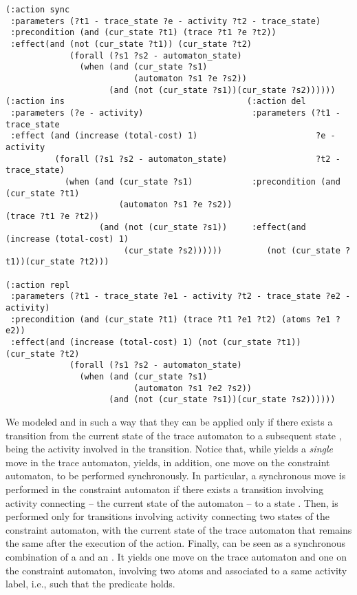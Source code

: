 \begin{scriptsize}
\begin{verbatim}
(:action sync
 :parameters (?t1 - trace_state ?e - activity ?t2 - trace_state)
 :precondition (and (cur_state ?t1) (trace ?t1 ?e ?t2))
 :effect(and (not (cur_state ?t1)) (cur_state ?t2)
             (forall (?s1 ?s2 - automaton_state)
               (when (and (cur_state ?s1)
                          (automaton ?s1 ?e ?s2))
                     (and (not (cur_state ?s1))(cur_state ?s2))))))
(:action ins                                     (:action del
 :parameters (?e - activity)                      :parameters (?t1 - trace_state
 :effect (and (increase (total-cost) 1)                        ?e - activity
          (forall (?s1 ?s2 - automaton_state)                  ?t2 - trace_state)
            (when (and (cur_state ?s1)            :precondition (and (cur_state ?t1)
                       (automaton ?s1 ?e ?s2))                     (trace ?t1 ?e ?t2))
                   (and (not (cur_state ?s1))     :effect(and (increase (total-cost) 1)
                        (cur_state ?s2))))))         (not (cur_state ?t1))(cur_state ?t2)))

(:action repl
 :parameters (?t1 - trace_state ?e1 - activity ?t2 - trace_state ?e2 - activity)
 :precondition (and (cur_state ?t1) (trace ?t1 ?e1 ?t2) (atoms ?e1 ?e2))
 :effect(and (increase (total-cost) 1) (not (cur_state ?t1)) (cur_state ?t2)
             (forall (?s1 ?s2 - automaton_state)
               (when (and (cur_state ?s1)
                          (automaton ?s1 ?e2 ?s2))
                     (and (not (cur_state ?s1))(cur_state ?s2))))))
\end{verbatim}
\end{scriptsize}
\smallskip

\noindent
We modeled  and  in such a way that they can be applied only if there exists a transition from the current state  of the trace automaton to a subsequent state , being  the activity involved in the transition.
Notice that, while   yields a \emph{single} move in the trace automaton,  yields, in addition, one move on the constraint automaton, to be performed synchronously. In particular, a synchronous move is performed in the constraint automaton if there exists a transition involving activity  connecting  -- the current state of the automaton -- to a state .
%
Then,   is performed only for transitions involving activity  connecting two states of the constraint automaton, with the current state of the trace automaton that remains the same after the execution of the action.
%
Finally,   can be seen as a synchronous combination of a  and an . It yields one move on the trace automaton and one on the constraint automaton, involving two atoms  and  associated to a same activity label, i.e., such that the predicate  holds.

